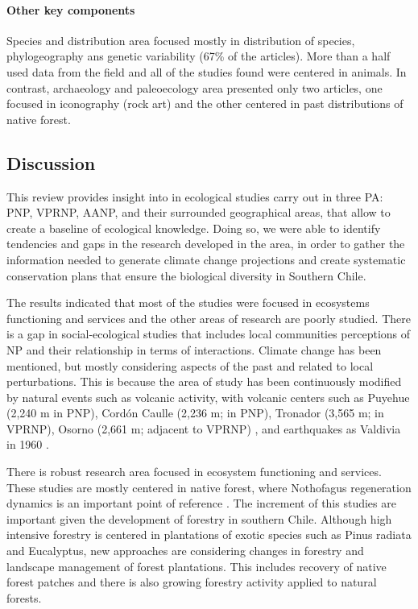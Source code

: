 \documentclass[]{article}
\let\oldparagraph\paragraph
\renewcommand{\paragraph}[1]{\oldparagraph{#1}\mbox{}}
\begin{document}
\hypertarget{other-key-components}{%
\paragraph{Other key components}\label{other-key-components}}

Species and distribution area focused mostly in distribution of species, phylogeography ans genetic variability (67\% of the articles). More than a half used data from the field and all of the studies found were centered in animals. In contrast, archaeology and paleoecology area presented only two articles, one focused in iconography (rock art) and the other centered in past distributions of native forest.

\hypertarget{discussion}{%
\subsection{Discussion}\label{discussion}}

This review provides insight into in ecological studies carry out in three PA: PNP, VPRNP, AANP, and their surrounded geographical areas, that allow to create a baseline of ecological knowledge. Doing so, we were able to identify tendencies and gaps in the research developed in the area, in order to gather the information needed to generate climate change projections and create systematic conservation plans that ensure the biological diversity in Southern Chile.

The results indicated that most of the studies were focused in ecosystems functioning and services and the other areas of research are poorly studied. There is a gap in social-ecological studies that includes local communities perceptions of NP and their relationship in terms of interactions.
Climate change has been mentioned, but mostly considering aspects of the past and related to local perturbations. This is because the area of study has been continuously modified by natural events such as volcanic activity, with volcanic centers such as Puyehue (2,240 m in PNP), Cordón Caulle (2,236 m; in PNP), Tronador (3,565 m; in VPRNP), Osorno (2,661 m; adjacent to VPRNP) \citep{petit1999cronologia, SternVolcanism}, and earthquakes as Valdivia in 1960 \citep{melnick2018back}.

There is robust research area focused in ecosystem functioning and services. These studies are mostly centered in native forest, where Nothofagus regeneration dynamics is an important point of reference \citep{VEBLEN1979nothofagus, Pollmann2004Nothofagus, Soto2017nothofagus}.
The increment of this studies are important given the development of forestry in southern Chile.
Although high intensive forestry is centered in plantations of exotic species such as Pinus radiata and Eucalyptus, new approaches are considering changes in forestry and landscape management of forest plantations. This includes recovery of native forest patches \citep{salas2016forest} and there is also growing forestry activity applied to natural forests.
\end{document}
